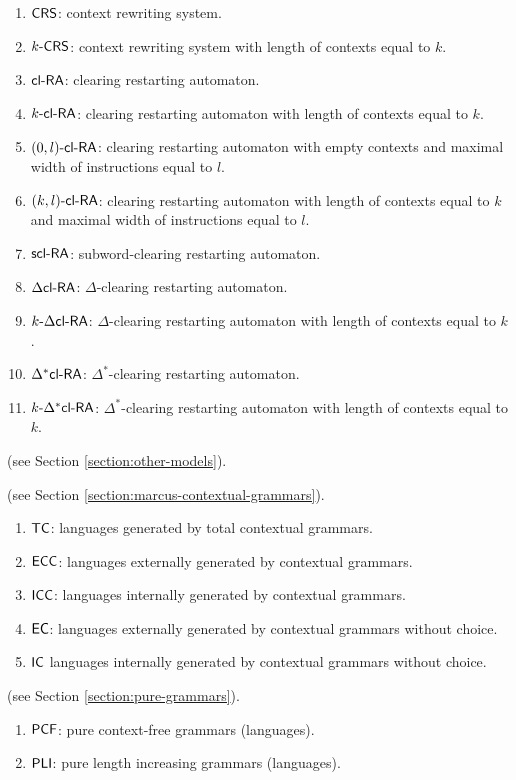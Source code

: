 \begin{enumerate}[]
\item $\textup{\sf CRS\/}$: context rewriting system.
\item $\textup{\sf $k$-\textup{\sf CRS\/}}$: context rewriting system with length of contexts equal to $k$.
\item $\textup{\sf cl-RA\/}$: clearing restarting automaton.
\item $\textup{\sf $k$-\textup{\sf cl-RA\/}}$: clearing restarting automaton with length of contexts equal to $k$.
\item $\textup{\sf $(0,l)$-\textup{\sf cl-RA\/}}$: clearing restarting automaton with empty contexts and maximal width of instructions equal to $l$.
\item $\textup{\sf $(k,l)$-\textup{\sf cl-RA\/}}$: clearing restarting automaton with length of contexts equal to $k$ and maximal width of instructions equal to $l$.
\item $\textup{\sf scl-RA}$: subword-clearing restarting automaton.
\item $\textup{\sf $\Delta$cl-RA\/}$: $\Delta$-clearing restarting automaton.
\item $\textup{\sf $k$-\textup{\sf $\Delta$cl-RA\/}}$: $\Delta$-clearing restarting automaton with length of contexts equal to $k$.
\item $\textup{\sf $\Delta^*$cl-RA\/}$: $\Delta^*$-clearing restarting automaton.
\item $\textup{\sf $k$-\textup{\sf $\Delta^*$cl-RA\/}}$: $\Delta^*$-clearing restarting automaton with length of contexts equal to $k$. 
\end{enumerate}

 (see Section \ref{section:other-models}).

 (see Section \ref{section:marcus-contextual-grammars}).

\begin{enumerate}[]
\item $\textup{\sf TC}$: languages generated by total contextual grammars.
\item $\textup{\sf ECC}$: languages externally generated by contextual grammars.
\item $\textup{\sf ICC}$: languages internally generated by contextual grammars.
\item $\textup{\sf EC}$: languages externally generated by contextual grammars without choice.
\item $\textup{\sf IC}$ languages internally generated by contextual grammars without choice.
\end{enumerate}

 (see Section \ref{section:pure-grammars}).

\begin{enumerate}[]
\item $\textup{\sf PCF}$: pure context-free grammars (languages).
\item $\textup{\sf PLI}$: pure length increasing grammars (languages).
\end{enumerate}

